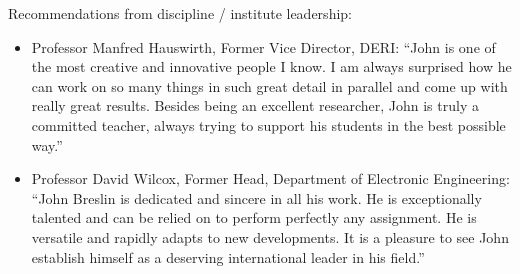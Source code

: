 \documentclass[10pt,a4paper]{res} %
\begin{document}
\begin{resume}
\begin{description}
\itemsep 20pt
\item Recommendations from discipline / institute leadership:
\begin{itemize}
\item Professor Manfred Hauswirth, Former Vice Director, DERI: ``John is one of the most creative and innovative people I know. I am always surprised how he can work on so many things in such great detail in parallel and come up with really great results. Besides being an excellent researcher, John is truly a committed teacher, always trying to support his students in the best possible way.''
\item Professor David Wilcox, Former Head, Department of Electronic Engineering: ``John Breslin is dedicated and sincere in all his work. He is exceptionally talented and can be relied on to perform perfectly any assignment. He is versatile and rapidly adapts to new developments. It is a pleasure to see John establish himself as a deserving international leader in his field.''
\end{itemize}
\end{description}


\end{resume} 
\end{document}
